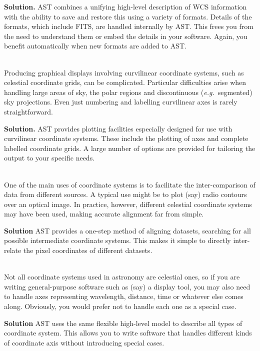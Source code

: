 \documentclass[twoside,11pt]{article}
\begin{document}
{\begin{description}
{\bf{Solution.}} AST combines a unifying high-level description of WCS
information with the ability to save and restore this using a variety
of formats. Details of the formats, which include FITS, are handled
internally by AST. This frees you from the need to understand them or
embed the details in your software. Again, you benefit automatically
when new formats are added to AST.

\item[3. Generating Graphical Output]\mbox{}\\
Producing graphical displays involving curvilinear coordinate systems,
such as celestial coordinate grids, can be complicated. Particular
difficulties arise when handling large areas of sky, the polar regions
and discontinuous ({\em{e.g.}}\ segmented) sky projections.  Even just
numbering and labelling curvilinear axes is rarely straightforward.

{\bf{Solution.}} AST provides plotting facilities especially designed
for use with curvilinear coordinate systems. These include the
plotting of axes and complete labelled coordinate grids.  A large
number of options are provided for tailoring the output to your
specific needs.

\item[4. Aligning Data from Different Sources]\mbox{}\\
One of the main uses of coordinate systems is to facilitate the
inter-comparison of data from different sources. A typical use might
be to plot (say) radio contours over an optical image.  In practice,
however, different celestial coordinate systems may have been used,
making accurate alignment far from simple.

{\bf{Solution}} AST provides a one-step method of aligning datasets,
searching for all possible intermediate coordinate systems.  This
makes it simple to directly inter-relate the pixel coordinates of
different datasets.

\item[5. Handling Different Types of Coordinate Sy\mbox{}stem]\mbox{}\\
Not all coordinate systems used in astronomy are celestial ones, so if
you are writing general-purpose software such as (say) a display tool,
you may also need to handle axes representing wavelength, distance,
time or whatever else comes along. Obviously, you would prefer not to
handle each one as a special case.

{\bf{Solution}} AST uses the same flexible high-level model to
describe all types of coordinate system. This allows you to write
software that handles different kinds of coordinate axis without
introducing special cases.
\end{description}

}
\end{document}
